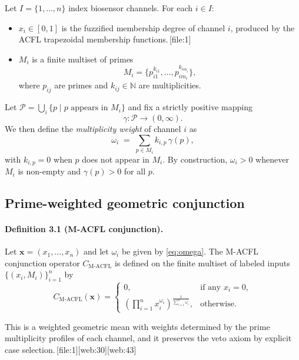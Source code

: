 \documentclass[11pt]{article}
\begin{document}
Let $I = \{1,\dots,n\}$ index biosensor channels. 
For each $i \in I$:

\begin{itemize}
  \item $x_i \in [0,1]$ is the fuzzified membership degree of channel $i$, produced by the ACFL trapezoidal membership functions.\,[file:1]
  \item $M_i$ is a finite multiset of primes
  \[
  M_i = \{p_{i1}^{k_{i1}},\dots,p_{im_i}^{k_{im_i}}\},
  \]
  where $p_{ij}$ are primes and $k_{ij} \in \mathbb{N}$ are multiplicities.
\end{itemize}

Let $\mathcal{P} = \bigcup_{i} \{p\mid p\text{ appears in }M_i\}$ and fix a strictly positive mapping
\[
\gamma : \mathcal{P} \to (0,\infty).
\]
We then define the \emph{multiplicity weight} of channel $i$ as
\begin{equation}
\omega_i \;=\; \sum_{p \in M_i} k_{i,p}\,\gamma(p),
\label{eq:omega}
\end{equation}
with $k_{i,p}=0$ when $p$ does not appear in $M_i$.
By construction, $\omega_i > 0$ whenever $M_i$ is non-empty and $\gamma(p)>0$ for all $p$.

\subsection{Prime-weighted geometric conjunction}

\paragraph{Definition 3.1 (M-ACFL conjunction).}
Let $\mathbf{x} = (x_1,\dots,x_n)$ and let $\omega_i$ be given by \eqref{eq:omega}. 
The M-ACFL conjunction operator $C_{\text{M-ACFL}}$ is defined on the finite multiset of labeled inputs $\{(x_i,M_i)\}_{i=1}^n$ by
\begin{equation}
C_{\text{M-ACFL}}(\mathbf{x}) =
\begin{cases}
0, & \text{if any } x_i = 0, \\[4pt]
\left(\displaystyle\prod_{i=1}^n x_i^{\omega_i}\right)^{\frac{1}{\sum_{i=1}^n \omega_i}}, & \text{otherwise.}
\end{cases}
\label{eq:m-acfl-conj}
\end{equation}

\noindent
This is a weighted geometric mean with weights determined by the prime multiplicity profiles of each channel, and it preserves the veto axiom by explicit case selection.\,[file:1][web:30][web:43] 
\end{document}
